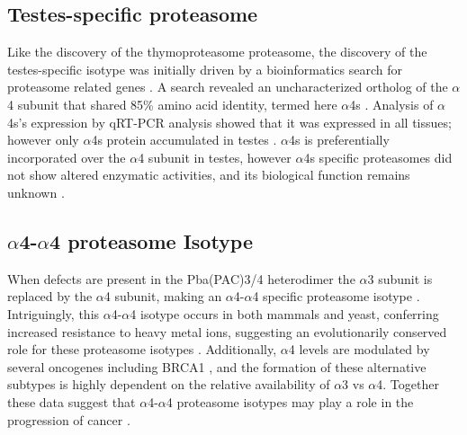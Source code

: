 \subsection{Testes-specific proteasome}
	Like the discovery of the thymoproteasome proteasome, the discovery of the testes-specific isotype was initially driven by a bioinformatics search for proteasome related genes \citep{uechi14}. A search revealed an uncharacterized ortholog of the $\alpha$4 subunit that shared 85\% amino acid identity, termed here $\alpha$4s \citep{uechi14}. Analysis of $\alpha$4s’s expression by qRT-PCR analysis showed that it was expressed in all tissues; however only $\alpha$4s protein accumulated in testes \citep{uechi14}. $\alpha$4s is preferentially incorporated over the $\alpha$4 subunit in testes, however $\alpha$4s specific proteasomes did not show altered enzymatic activities, and its biological function remains unknown \citep{uechi14}.  

\subsection{$\alpha$4-$\alpha$4 proteasome Isotype}
	When defects are present in the Pba(PAC)3/4 heterodimer the $\alpha$3 subunit is replaced by the $\alpha$4 subunit, making an $\alpha$4-$\alpha$4 specific proteasome isotype \citep{kusmierczyk08, padmanabhan16}.  Intriguingly, this $\alpha$4-$\alpha$4 isotype occurs in both mammals and yeast, conferring increased resistance to heavy metal ions, suggesting an evolutionarily conserved role for these proteasome isotypes \citep{kusmierczyk08, padmanabhan16}.  Additionally, $\alpha$4 levels are modulated by several oncogenes including BRCA1 \citep{li15}, and the formation of these alternative subtypes is highly dependent on the relative availability of $\alpha$3 vs $\alpha$4. Together these data suggest that $\alpha$4-$\alpha$4 proteasome isotypes may play a role in the progression of cancer \citep{padmanabhan16}.
\FloatBarrier
